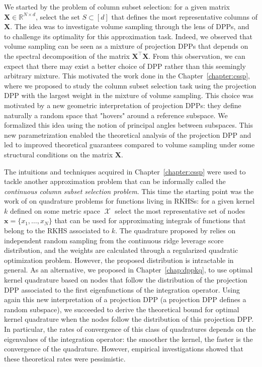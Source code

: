 \documentclass[twoside,11pt]{book}
\numberwithin{theorem}{chapter}
\numberwithin{definition}{chapter}
\numberwithin{proposition}{chapter}
\numberwithin{corollary}{chapter}
\numberwithin{example}{chapter}
\numberwithin{lemma}{chapter}
\numberwithin{assumption}{chapter}
\numberwithin{equation}{chapter}
\numberwithin{figure}{chapter}
\DeclareMathOperator{\Tran}{\intercal}
\DeclareMathOperator{\X}{\mathcal{X}}
\begin{document}
We started by the problem of column subset selection: for a given matrix $\bm{X} \in \mathbb{R}^{N \times d}$, select the set $S \subset [d]$ that defines the most representative columns of $\bm{X}$. 
The idea was to investigate volume sampling through the lens of DPPs, and to challenge its optimality for this approximation task. Indeed,  we observed that volume sampling can be seen as a mixture of projection DPPs that depends on the spectral decomposition of the matrix $\bm{X}^{\Tran}\bm{X}$. From this observation, we can expect that there may exist a better choice of DPP rather than this seemingly arbitrary mixture. This motivated the work done in the Chapter~\ref{chapter:cssp}, where we proposed to study the column subset selection task using the projection DPP with the largest weight in the mixture of volume sampling. This choice was motivated by a new geometric interpretation of projection DPPs: they define naturally a random space that "hovers" around a reference subspace. We formalized this idea  using the notion of principal angles between subspaces. This new parametrization enabled the theoretical analysis of the  projection DPP and led to improved theoretical guarantees compared to  volume sampling under some structural conditions on the matrix $\bm{X}$.

The intuitions and techniques acquired in Chapter~\ref{chapter:cssp} were used to tackle another approximation problem that can be informally called the \emph{ continuous column subset selection problem}. This time the starting point was the work of \cite{Bac17} on quadrature problems for functions living in RKHSs: for a given kernel $k$ defined on some metric space $\X$ select the most representative set of nodes $\bm{x} = \{x_{1}, \dots, x_{N} \}$ that can be used for approximating integrals of functions that belong to the RKHS associated to $k$. The quadrature proposed by \cite{Bac17} relies on independent random sampling from the continuous ridge leverage score distribution, and the weights are calculated through a regularized quadratic optimization problem. However, the proposed distribution is intractable in general. As an alternative, we proposed in Chapter~\ref{chap:dppkq}, to use optimal kernel quadrature based on nodes that follow the distribution of
the projection DPP associated to the first eigenfunctions of the integration operator. Using again this new interpretation of a projection DPP (a projection DPP defines a random subspace), we succeeded to derive the theoretical bound for optimal kernel quadrature when the nodes follow the distribution of this projection DPP.
In particular, the rates of convergence of this class of quadratures depends on the eigenvalues of the integration operator: the smoother the kernel, the faster is the convergence of the quadrature. However, empirical investigations showed that these theoretical rates were pessimistic. 
\end{document}
